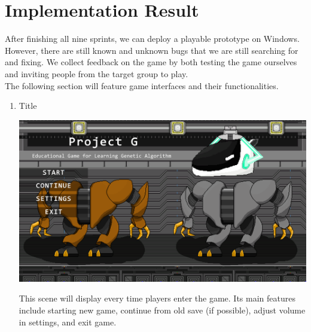 \documentclass[12pt,oneside,openright,a4paper]{cpe-english-project}
\begin{document}
\section{Implementation Result}
After finishing all nine sprints, we can deploy a playable prototype on Windows. However, there are still known and unknown bugs that we are still searching for and fixing. We collect feedback on the game by both testing the game ourselves and inviting people from the target group to play. \\
The following section will feature game interfaces and their functionalities.
\begin{enumerate}
	\item Title \\
	\begin{minipage}[c]{\textwidth}\centering
	\includegraphics[width=14cm]{figure/screenshot/screenshot-title.png}
	\end{minipage}
	This scene will display every time players enter the game. Its main features include starting new game, continue from old save (if possible), adjust volume in settings, and exit game.


\end{enumerate}
\end{document}
